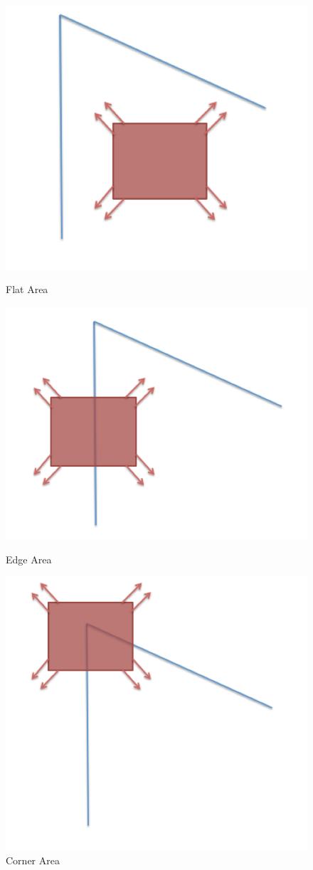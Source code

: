 \begin{figure}[ht!]
\centering
\begin{minipage}{.5\textwidth}
	\centering
	\includegraphics[width=.6\linewidth]{images/flatArea.png}
	\caption{Flat Area}
	\label{fig:flatArea}
\end{minipage}%
\begin{minipage}{.5\textwidth}
	\centering
	\includegraphics[width=.6\linewidth]{images/edgeArea.png}
	\caption{Edge Area}
	\label{fig:edgeArea}
\end{minipage}
\begin{minipage}{.5\textwidth}
	\centering
	\includegraphics[width=.6\linewidth]{images/cornerArea.png}
	\caption{Corner Area}
	\label{fig:cornerArea}
\end{minipage}
\end{figure}


